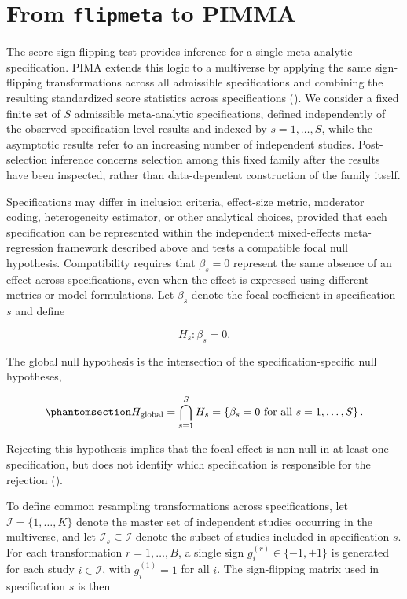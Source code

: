 \documentclass[
  man,
  longtable,
  nolmodern,
  notxfonts,
  notimes,
  colorlinks=true,linkcolor=blue,citecolor=blue,urlcolor=blue]{apa7}
\begin{document}
\section{\texorpdfstring{From \texttt{flipmeta} to
PIMMA}{From flipmeta to PIMMA}}\label{from-flipmeta-to-pimma}

The score sign-flipping test provides inference for a single
meta-analytic specification. PIMA extends this logic to a multiverse by
applying the same sign-flipping transformations across all admissible
specifications and combining the resulting standardized score statistics
across specifications (). We consider a fixed finite set of \(S\) admissible meta-analytic
specifications, defined independently of the observed
specification-level results and indexed by \(s=1,\ldots,S\), while the
asymptotic results refer to an increasing number of independent studies.
Post-selection inference concerns selection among this fixed family
after the results have been inspected, rather than data-dependent
construction of the family itself.

Specifications may differ in inclusion criteria, effect-size metric,
moderator coding, heterogeneity estimator, or other analytical choices,
provided that each specification can be represented within the
independent mixed-effects meta-regression framework described above and
tests a compatible focal null hypothesis. Compatibility requires that
\(\beta_s = 0\) represent the same absence of an effect across
specifications, even when the effect is expressed using different
metrics or model formulations. Let \(\beta_s\) denote the focal
coefficient in specification \(s\) and define

\[
H_s:\beta_s=0.
\]

The global null hypothesis is the intersection of the
specification-specific null hypotheses,

\begin{equation}\phantomsection\label{eq-global-null}{
H_{\mathrm{global}}
=
\bigcap_{s=1}^{S} H_s
=
\left\{
\beta_s=0
\text{ for all }
s=1,\ldots,S
\right\}.
}\end{equation}

Rejecting this hypothesis implies that the focal effect is non-null in
at least one specification, but does not identify which specification is
responsible for the rejection ().

To define common resampling transformations across specifications, let
\(\mathcal{I} = \{1,\ldots,K\}\) denote the master set of independent
studies occurring in the multiverse, and let
\(\mathcal{I}_s\subseteq\mathcal{I}\) denote the subset of studies
included in specification \(s\). For each transformation
\(r=1,\ldots,B\), a single sign \(g_i^{(r)}\in\{-1,+1\}\) is generated
for each study \(i\in\mathcal{I}\), with \(g_i^{(1)}=1\) for all \(i\).
The sign-flipping matrix used in specification \(s\) is then
\end{document}
